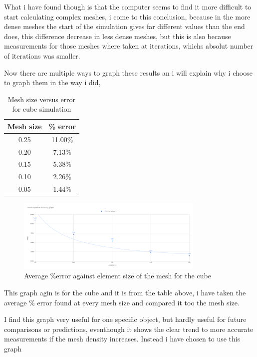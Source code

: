 \documentclass[12pt,a4paper]{article}
\begin{document}
What i have found though is that the computer seems to find it more difficult to start calculating complex meshes, i come to this conclusion, because in the more dense meshes the start of the simulation gives far different values than the end does, this difference decrease in less dense meshes, but this is also because measurements for those meshes where taken at iterations, whichs absolut number of iterations was smaller.

Now there are multiple ways to graph these results an i will explain why i choose to graph them in the way i did, 

\begin{table}[H]
\centering
\caption{Mesh size versus error for cube simulation}
\label{tab:cube_mesh_error}
\begin{tabular}{|c|c|}
\hline
\rowcolor{lightblue}
\textbf{Mesh size} & \textbf{\% error} \\
\hline
0.25 & 11.00\% \\
\hline
0.20 & 7.13\% \\
\hline
0.15 & 5.38\% \\
\hline
0.10 & 2.26\% \\
\hline
0.05 & 1.44\% \\
\hline
\end{tabular}
\end{table}

\begin{figure}[H]
\centering
\includegraphics[width=0.8\textwidth]{image22.png}
\caption{Average \%error against element size of the mesh for the cube}
\label{fig:cube_mesh_error}
\end{figure}

This graph agin is for the cube and it is from the table above, i have taken the average \% error found at every mesh size and compared it too the mesh size.

I find this graph very useful for one specific object, but hardly useful for future comparisons or predictions, eventhough it shows the clear trend to more accurate measurements if the mesh density increases. Instead i have chosen to use this graph
\end{document}
